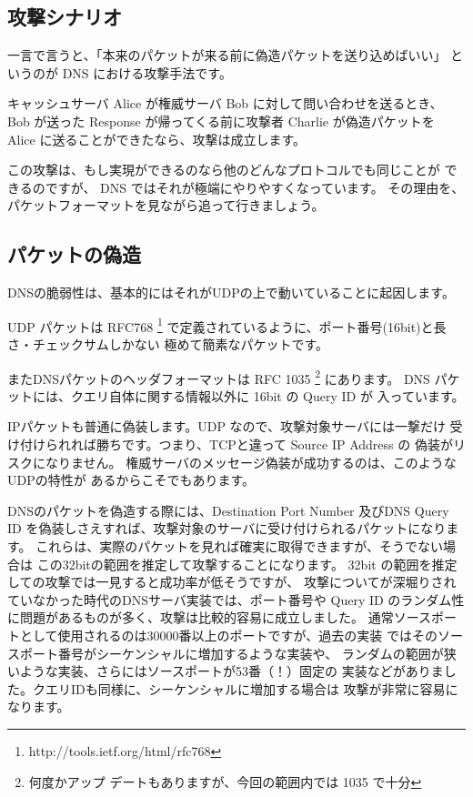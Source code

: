 \subsection{攻撃シナリオ}
一言で言うと、「本来のパケットが来る前に偽造パケットを送り込めばいい」
というのが DNS における攻撃手法です。

キャッシュサーバ Alice が権威サーバ Bob に対して問い合わせを送るとき、
Bob が送った Response が帰ってくる前に攻撃者 Charlie が偽造パケットを
Alice に送ることができたなら、攻撃は成立します。

この攻撃は、もし実現ができるのなら他のどんなプロトコルでも同じことが
できるのですが、 DNS ではそれが極端にやりやすくなっています。
その理由を、パケットフォーマットを見ながら追って行きましょう。

\subsection{パケットの偽造}
DNSの脆弱性は、基本的にはそれがUDPの上で動いていることに起因します。


UDP パケットは RFC768 \footnote{http://tools.ietf.org/html/rfc768}
で定義されているように、ポート番号(16bit)と長さ・チェックサムしかない
極めて簡素なパケットです。


またDNSパケットのヘッダフォーマットは RFC 1035 \footnote{何度かアップ
デートもありますが、今回の範囲内では 1035 で十分} にあります。
DNS パケットには、クエリ自体に関する情報以外に 16bit の Query ID が
入っています。

IPパケットも普通に偽装します。UDP なので、攻撃対象サーバには一撃だけ
受け付けられれば勝ちです。つまり、TCPと違って Source IP Address の
偽装がリスクになりません。
権威サーバのメッセージ偽装が成功するのは、このようなUDPの特性が
あるからこそでもあります。

DNSのパケットを偽造する際には、Destination Port Number 及びDNS Query
ID を偽装しさえすれば、攻撃対象のサーバに受け付けられるパケットになります。
これらは、実際のパケットを見れば確実に取得できますが、そうでない場合は
この32bitの範囲を推定して攻撃することになります。
32bit の範囲を推定しての攻撃では一見すると成功率が低そうですが、
攻撃についてが深堀りされていなかった時代のDNSサーバ実装では、ポート番号や
Query ID のランダム性に問題があるものが多く、攻撃は比較的容易に成立しました。
通常ソースポートとして使用されるのは30000番以上のポートですが、過去の実装
ではそのソースポート番号がシーケンシャルに増加するような実装や、
ランダムの範囲が狭いような実装、さらにはソースポートが53番（！）固定の
実装などがありました。クエリIDも同様に、シーケンシャルに増加する場合は
攻撃が非常に容易になります。

